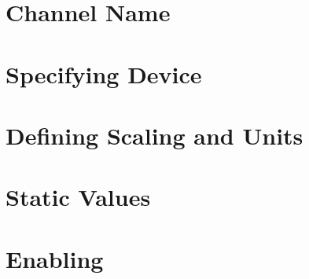 \section{Channel Name}
\section{Specifying Device}
\section{Defining Scaling and Units}
\section{Static Values}
\section{Enabling}
